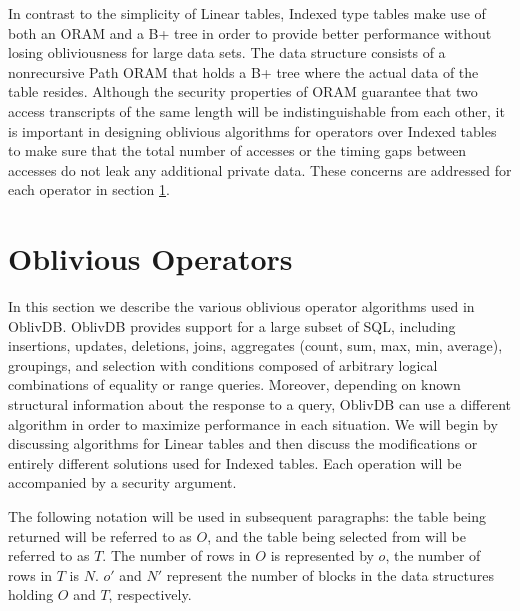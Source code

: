 \documentclass[USenglish,oneside,twocolumn]{article}
\def\name/{OblivDB}
\begin{document}
In contrast to the simplicity of Linear tables, Indexed type tables make use of both an ORAM and a B+ tree in order to provide better performance without losing obliviousness for large data sets. The data structure consists of a nonrecursive Path ORAM that holds a B+ tree where the actual data of the table resides. Although the security properties of ORAM guarantee that two access transcripts of the same length will be indistinguishable from each other, it is important in designing oblivious algorithms for operators over Indexed tables to make sure that the total number of accesses or the timing gaps between accesses do not leak any additional private data. These concerns are addressed for each operator in section \ref{oblivOps}. 

\section{Oblivious Operators}\label{oblivOps}
In this section we describe the various oblivious operator algorithms used in \name/. \name/ provides support for a large subset of SQL, including insertions, updates, deletions, joins, aggregates (count, sum, max, min, average), groupings, and selection with conditions composed of arbitrary logical combinations of equality or range queries. Moreover, depending on known structural information about the response to a query, \name/ can use a different algorithm in order to maximize performance in each situation. We will begin by discussing algorithms for Linear tables and then discuss the modifications or entirely different solutions used for Indexed tables. Each operation will be accompanied by a security argument. 

The following notation will be used in subsequent paragraphs: the table being returned will be referred to as $O$, and the table being selected from will be referred to as $T$. The number of rows in $O$ is represented by $o$, the number of rows in $T$ is $N$. $o'$ and $N'$ represent the number of blocks in the data structures holding $O$ and $T$, respectively. 
\end{document}
